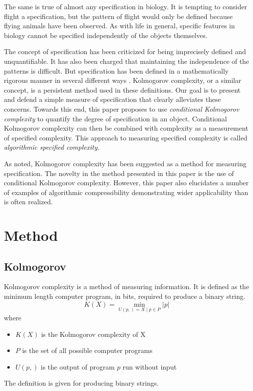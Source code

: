 The same is true of almost any specification in biology.
It is tempting to consider flight a specification, but the pattern of flight would only be defined because flying animals have been observed.
As with life in general, specific features in biology cannot be specified independently of the objects themselves.

The concept of specification has been criticized for being imprecisely defined and unquantifiable.
It has also been charged that maintaining the independence of the patterns is difficult.
But specification has been defined in a mathematically rigorous manner in several different ways \citep{Dembski1998, Dembski2002, Dembski2005a}.
Kolmogorov complexity, or a similar concept, is a persistent method used in these definitions.
Our goal is to present and defend a simple measure of specification that clearly alleviates these concerns.
Towards this end, this paper proposes to use \textit{conditional Kolmogorov complexity} to quantify the degree of specification in an object.
Conditional Kolmogorov complexity can then be combined with complexity as a measurement of specified complexity. This approach to measuring specified complexity is called \textit{algorithmic specified complexity}.

As noted, Kolmogorov complexity has been suggested as a method for measuring specification.
The novelty in the method presented in this paper is the use of conditional Kolmogorov complexity.
However, this paper also elucidates a number of examples of algorithmic compressibility demonstrating wider applicability than is often realized.

\section{Method}

\subsection{Kolmogorov}

Kolmogorov complexity is a method of measuring information.
It is defined as the minimum length computer program, in bits, required to produce a binary string.
\begin{equation}
    K(X) = \min_{U(p,) = X \mid p \in P} |p|
\end{equation} where
\begin{itemize}
    \item $K(X)$ is the Kolmogorov complexity of X
    \item $P$ is the set of all possible computer programs
    \item $U(p,)$ is the output of program $p$ run without input
\end{itemize}
The definition is given for producing binary strings.

